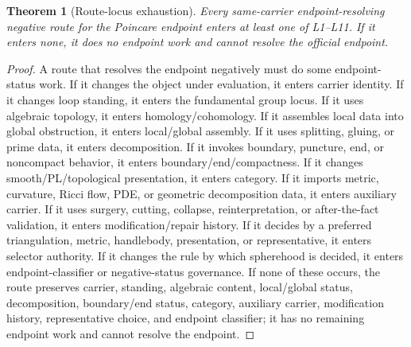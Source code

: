 \documentclass[11pt]{article}
\newtheorem{theorem}{Theorem}[section]
\begin{document}
\begin{theorem}[Route-locus exhaustion]\label{thm:route-locus-exhaustion}
Every same-carrier endpoint-resolving negative route for the Poincare endpoint enters at least one of L1--L11. If it enters none, it does no endpoint work and cannot resolve the official endpoint.
\end{theorem}
\begin{proof}
A route that resolves the endpoint negatively must do some endpoint-status work. If it changes the object under evaluation, it enters carrier identity. If it changes loop standing, it enters the fundamental group locus. If it uses algebraic topology, it enters homology/cohomology. If it assembles local data into global obstruction, it enters local/global assembly. If it uses splitting, gluing, or prime data, it enters decomposition. If it invokes boundary, puncture, end, or noncompact behavior, it enters boundary/end/compactness. If it changes smooth/PL/topological presentation, it enters category. If it imports metric, curvature, Ricci flow, PDE, or geometric decomposition data, it enters auxiliary carrier. If it uses surgery, cutting, collapse, reinterpretation, or after-the-fact validation, it enters modification/repair history. If it decides by a preferred triangulation, metric, handlebody, presentation, or representative, it enters selector authority. If it changes the rule by which spherehood is decided, it enters endpoint-classifier or negative-status governance. If none of these occurs, the route preserves carrier, standing, algebraic content, local/global status, decomposition, boundary/end status, category, auxiliary carrier, modification history, representative choice, and endpoint classifier; it has no remaining endpoint work and cannot resolve the endpoint.
\end{proof}
\end{document}
